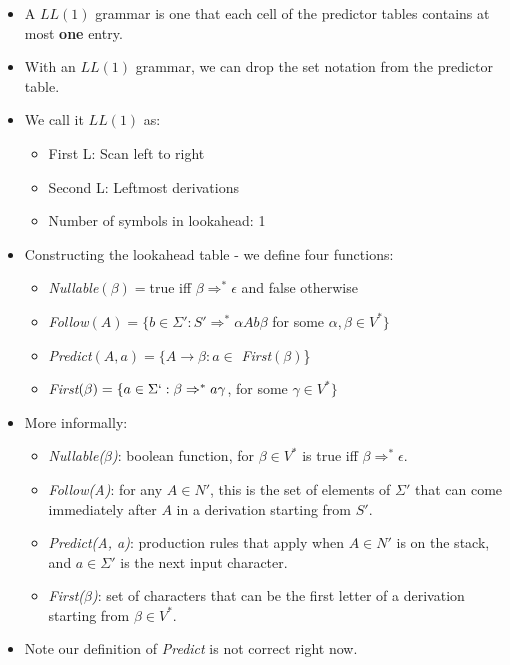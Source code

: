 \documentclass[12pt]{article}
\begin{document}
\begin{itemize}
    \item A $LL(1)$ grammar is one that each cell of the predictor tables contains at most \textbf{one} entry.
    \item With an $LL(1)$ grammar, we can drop the set notation from the predictor table.
    \item We call it $LL(1)$ as:
        \begin{itemize}
            \item First L: Scan left to right
            \item Second L: Leftmost derivations
            \item Number of symbols in lookahead: 1
        \end{itemize}
    \item Constructing the lookahead table - we define four functions:
        \begin{itemize}
            \item \emph{Nullable}$(\beta) = $true iff $\beta \Rightarrow^* \epsilon$ and false otherwise
            \item \emph{Follow}$(A) = \{b \in \Sigma' : S' \Rightarrow^* \alpha Ab \beta$ for some $\alpha, \beta \in V^*\}$
            \item \emph{Predict}$(A, a) = \{A \rightarrow \beta : a \in $ \emph{First}$(\beta)$\}
            \item \emph{First}$(\beta) = \{a \in \Sigma` : \beta \Rightarrow^* a\gamma$, for some $\gamma \in V^*\}$
        \end{itemize}
    \item More informally:
        \begin{itemize}
            \item \emph{Nullable($\beta$)}: boolean function, for $\beta \in V^*$ is true iff $\beta \Rightarrow^* \epsilon$.
            \item \emph{Follow(A)}: for any $A \in N'$, this is the set of elements of $\Sigma'$ that can come immediately after $A$ in a derivation starting from $S'$.
            \item \emph{Predict(A, a)}: production rules that apply when $A \in N'$ is on the stack, and $a \in \Sigma'$ is the next input character.
            \item \emph{First($\beta$)}: set of characters that can be the first letter of a derivation starting from $\beta \in V^*$.
        \end{itemize}
    \item Note our definition of \emph{Predict} is not correct right now.

\end{itemize}
\end{document}
